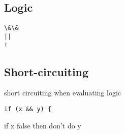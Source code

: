 
\subsection{Logic}

\begin{verbatim}
\&\&
||
!
\end{verbatim}



\subsection{Short-circuiting}
short circuiting when evaluating logic

\begin{verbatim}
if (x && y) {
\end{verbatim}

if x false then don't do y

